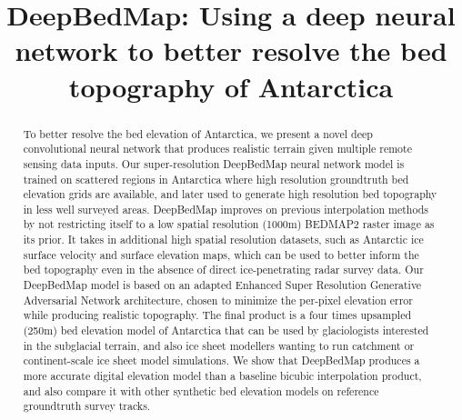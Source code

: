 \documentclass[tc, manuscript]{copernicus}
\begin{document}
\title{DeepBedMap: Using a deep neural network to better resolve the bed topography of Antarctica}













\received{}
\pubdiscuss{} %
\revised{}
\accepted{}
\published{}




\maketitle



\begin{abstract}
To better resolve the bed elevation of Antarctica, we present a novel deep convolutional neural network that produces realistic terrain given multiple remote sensing data inputs.
Our super-resolution DeepBedMap neural network model is trained on scattered regions in Antarctica where high resolution groundtruth bed elevation grids are available, and later used to generate high resolution bed topography in less well surveyed areas.
DeepBedMap improves on previous interpolation methods by not restricting itself to a low spatial resolution (1000m) BEDMAP2 raster image as its prior.
It takes in additional high spatial resolution datasets, such as Antarctic ice surface velocity and surface elevation maps, which can be used to better inform the bed topography even in the absence of direct ice-penetrating radar survey data.
Our DeepBedMap model is based on an adapted Enhanced Super Resolution Generative Adversarial Network architecture, chosen to minimize the per-pixel elevation error while producing realistic topography.
The final product is a four times upsampled (250m) bed elevation model of Antarctica that can be used by glaciologists interested in the subglacial terrain, and also ice sheet modellers wanting to run catchment or continent-scale ice sheet model simulations.
We show that DeepBedMap produces a more accurate digital elevation model than a baseline bicubic interpolation product, and also compare it with other synthetic bed elevation models on reference groundtruth survey tracks.
\end{abstract}
\end{document}

